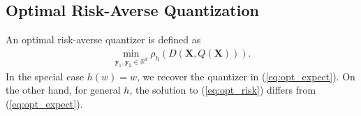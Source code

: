 \documentclass[conference]{IEEEtran}
\begin{document}
%

\subsection{Optimal Risk-Averse Quantization}

An optimal risk-averse quantizer is defined as 
\begin{align}\label{eq:opt_risk}
\min_{\mathbf{y}_1,\mathbf{y}_2 \in \mathbb{R}^d} \rho_h(D(\mathbf{X},Q(\mathbf{X}))).
\end{align}
In the special case $h(w) = w$, we recover the quantizer in (\ref{eq:opt_expect}). On the other hand, for general $h$, the solution to (\ref{eq:opt_risk}) differs from (\ref{eq:opt_expect}). 
\end{document}
